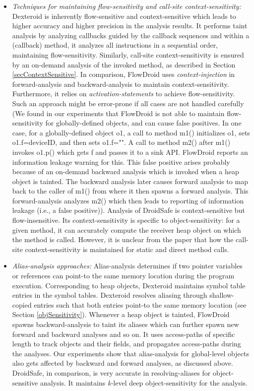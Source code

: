 \documentclass[10pt]{elsarticle}
\begin{document}
\begin{itemize}
\item \emph{Techniques for maintaining flow-sensitivity and call-site context-sensitivity:} Dexteroid is inherently flow-sensitive and context-sensitive which leads to higher accuracy and higher precision in the analysis results. It performs taint analysis by analyzing callbacks guided by the callback sequences and within a (callback) method, it analyzes all instructions in a sequential order, maintaining flow-sensitivity. Similarly, call-site context-sensitivity is ensured by an on-demand analysis of the invoked method, as described in Section \ref{secContextSensitive}. In comparison, FlowDroid uses \emph{context-injection} in forward-analysis and backward-analysis to maintain context-sensitivity. Furthermore, it relies on \emph{activation-statements} to achieve flow-sensitivity. Such an approach might be error-prone if all cases are not handled carefully (We found in our experiments that FlowDroid is not able to maintain flow-sensitivity for globally-defined objects, and can cause false positives. In one case, for a globally-defined object {\ttfamily o1}, a call to method {\ttfamily m1()} initializes {\ttfamily o1}, sets {\ttfamily o1.f=deviceID}, and then sets {\ttfamily o1.f=""}. A call to method {\ttfamily m2()} after {\ttfamily m1()} invokes {\ttfamily o1.p()} which gets {\ttfamily f} and passes it to a sink API. FlowDroid reports an information leakage warning for this. This false positive arises probably because of an on-demand backward analysis which is invoked when a heap object is tainted. The backward analysis later causes forward analysis to map back to the caller of {\ttfamily m1()} from where it then spawns a forward analysis. This forward-analysis analyzes {\ttfamily m2()} which then leads to reporting of information leakage (i.e., a false positive)). Analysis of DroidSafe \cite{DroidSafe} is context-sensitive but flow-insensitive. Its context-sensitivity is specific to object-sensitivity: for a given method, it can accurately compute the receiver heap object on which the method is called. However, it is unclear from the paper that how the call-site context-sensitivity is maintained for static and direct method calls.

\item \emph{Alias-analysis approaches:} Alias-analysis determines if two pointer variables or references can point-to the same memory location during the program execution. Corresponding to heap objects, Dexteroid maintains symbol table entries in the symbol tables. Dexteroid resolves aliasing through shallow-copied entries such that both entries point-to the same memory location (see Section \ref{objSensitivity}). Whenever a heap object is tainted, FlowDroid spawns backward-analysis to taint its aliases which can further spawn new forward and backward analyses and so on. It uses access-paths of specific length to track objects and their fields, and propagates access-paths during the analyses. Our experiments show that alias-analysis for global-level objects also gets affected by backward and forward analyses, as discussed above. DroidSafe, in comparison, is very accurate in resolving-aliases for object-sensitive analysis. It maintains \emph{k-}level deep object-sensitivity for the analysis.


\end{itemize}
\end{document}
